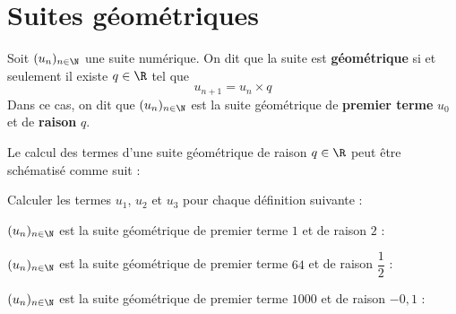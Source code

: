\documentclass{article}
\begin{document}
\section{Suites géométriques}
\begin{tcolorbox}
\begin{definition}
Soit $(u_n)_{n \in \N}$ une suite numérique. On dit que la suite est \textbf{géométrique} si et seulement il existe $q \in \R$ tel que
\begin{equation*}
u_{n+1} = u_n \times q
\end{equation*}
Dans ce cas, on dit que $(u_n)_{n \in \N}$ est la suite géométrique de \textbf{premier terme} $u_0$ et de \textbf{raison} $q$.
\end{definition}
\end{tcolorbox}
\begin{remark}
Le calcul des termes d'une suite géométrique de raison $q \in \R$ peut être schématisé comme suit :
\begin{center}
\end{center}
\end{remark}
\begin{example}
Calculer les termes $u_1$, $u_2$ et $u_3$ pour chaque définition suivante :
\begin{enumquestions}
\item $(u_n)_{n \in \N}$ est la suite géométrique de premier terme $1$ et de raison $2$ : \answersline
\item $(u_n)_{n \in \N}$ est la suite géométrique de premier terme $64$ et de raison $\dfrac{1}{2}$ : \answersline
\item $(u_n)_{n \in \N}$ est la suite géométrique de premier terme $1000$ et de raison $-0,1$ : \answersline
\end{enumquestions}
\end{example}
\end{document}
